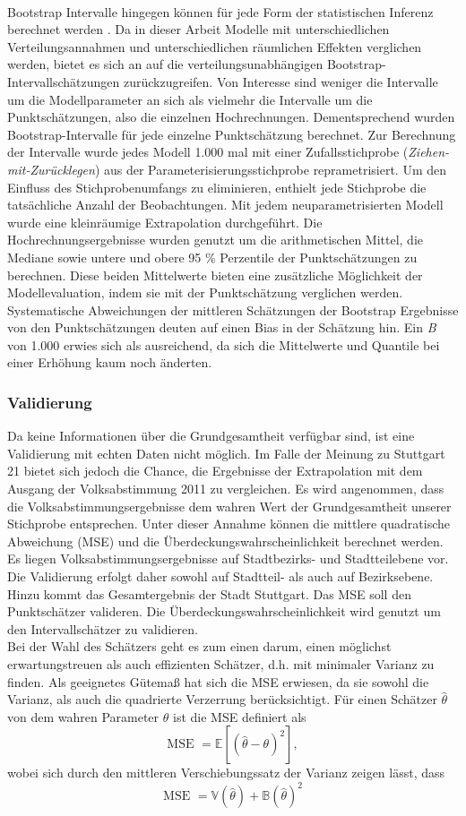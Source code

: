 \documentclass{Vorlage}
\begin{document}
\\Bootstrap Intervalle hingegen können für jede Form der statistischen Inferenz berechnet werden \cite{diciccio1996}. Da in dieser Arbeit Modelle mit unterschiedlichen Verteilungsannahmen und unterschiedlichen räumlichen Effekten verglichen werden, bietet es sich an auf die verteilungsunabhängigen Bootstrap-Intervallschätzungen zurückzugreifen. Von Interesse sind weniger die Intervalle um die Modellparameter an sich als vielmehr die Intervalle um die Punktschätzungen, also die einzelnen Hochrechnungen. Dementsprechend wurden Bootstrap-Intervalle für jede einzelne Punktschätzung berechnet. Zur Berechnung der Intervalle wurde jedes Modell 1.000 mal mit einer Zufallsstichprobe (\textit{Ziehen-mit-Zurücklegen}) aus der Parameterisierungsstichprobe reprametrisiert. Um den Einfluss des Stichprobenumfangs zu eliminieren, enthielt jede Stichprobe die tatsächliche Anzahl der Beobachtungen. Mit jedem neuparametrisierten Modell wurde eine kleinräumige Extrapolation durchgeführt. Die Hochrechnungsergebnisse wurden genutzt um die arithmetischen Mittel, die Mediane sowie untere und obere 95 \% Perzentile der Punktschätzungen zu berechnen. Diese beiden Mittelwerte bieten eine zusätzliche Möglichkeit der Modellevaluation, indem sie mit der Punktschätzung verglichen werden. Systematische Abweichungen der mittleren Schätzungen der Bootstrap Ergebnisse von den Punktschätzungen deuten auf einen Bias in der Schätzung hin. Ein \textit{B} von 1.000 erwies sich als ausreichend, da sich die Mittelwerte und Quantile bei einer Erhöhung kaum noch änderten.

\subsubsection{Validierung}
Da keine Informationen über die Grundgesamtheit verfügbar sind, ist eine Validierung mit echten Daten nicht möglich. Im Falle der Meinung zu Stuttgart 21 bietet sich jedoch die Chance, die Ergebnisse der Extrapolation mit dem Ausgang der Volksabstimmung 2011 \cite{Amt} zu vergleichen. Es wird angenommen, dass die Volksabstimmungsergebnisse dem wahren Wert der Grundgesamtheit unserer Stichprobe entsprechen. Unter dieser Annahme können die mittlere quadratische Abweichung (MSE) und die Überdeckungswahrscheinlichkeit berechnet werden. Es liegen Volksabstimmungsergebnisse auf Stadtbezirks- und Stadtteilebene vor. Die Validierung erfolgt daher sowohl auf Stadtteil- als auch auf Bezirksebene. Hinzu kommt das Gesamtergebnis der Stadt Stuttgart. Das MSE soll den Punktschätzer valideren. Die Überdeckungswahrscheinlichkeit wird genutzt um den Intervallschätzer zu validieren.\\
Bei der Wahl des Schätzers geht es zum einen darum, einen möglichst erwartungstreuen als auch effizienten Schätzer, d.h. mit minimaler Varianz zu finden. Als geeignetes Gütemaß hat sich die MSE erwiesen, da sie sowohl die Varianz, als 
auch die quadrierte Verzerrung berücksichtigt. Für einen Schätzer $\hat{\theta}$ von dem wahren Parameter $\theta$ ist die MSE definiert als
$$
\text{MSE } = \mathbb{E}[(\hat{\theta} - \theta)^2],
$$
wobei sich durch den mittleren Verschiebungssatz der Varianz zeigen lässt, dass
$$
\text{MSE } = \mathbb{V}(\hat{\theta}) + \mathbb{B}(\hat{\theta})^2
$$
\end{document}
